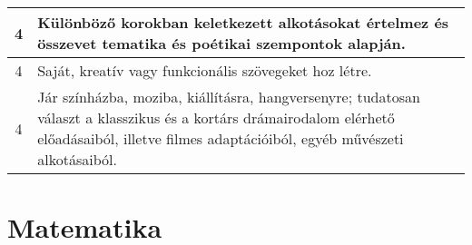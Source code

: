 \begin{longtable}{c | p{12cm} }
                                          4 &  Különböző korokban keletkezett alkotásokat értelmez és összevet tematika és poétikai szempontok alapján. \\ \hline
                                          4 &  Saját, kreatív vagy funkcionális szövegeket hoz létre. \\ \hline
                                          4 &  Jár színházba, moziba, kiállításra, hangversenyre; tudatosan választ a klasszikus és a kortárs drámairodalom elérhető előadásaiból, illetve filmes adaptációiból, egyéb művészeti alkotásaiból. \\ \hline
                                      
                        \end{longtable}
            \clearpage

        \section{Matematika}

